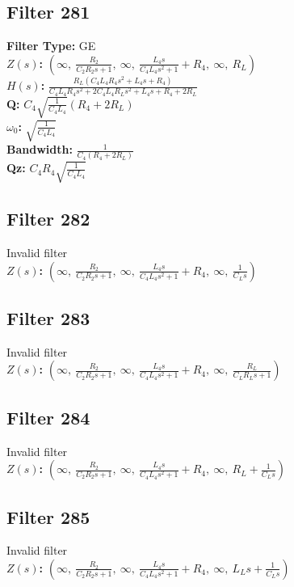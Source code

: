 \documentclass{article}
\begin{document}
\subsection*{Filter 281}
\textbf{Filter Type:} GE \\ 
\textbf{$Z(s)$:} $\left( \infty, \  \frac{R_{2}}{C_{2} R_{2} s + 1}, \  \infty, \  \frac{L_{4} s}{C_{4} L_{4} s^{2} + 1} + R_{4}, \  \infty, \  R_{L}\right)$ \\ 
\textbf{$H(s)$:} $\frac{R_{L} \left(C_{4} L_{4} R_{4} s^{2} + L_{4} s + R_{4}\right)}{C_{4} L_{4} R_{4} s^{2} + 2 C_{4} L_{4} R_{L} s^{2} + L_{4} s + R_{4} + 2 R_{L}}$ \\ 
\textbf{Q:} $C_{4} \sqrt{\frac{1}{C_{4} L_{4}}} \left(R_{4} + 2 R_{L}\right)$ \\ 
\textbf{$\omega_0$:} $\sqrt{\frac{1}{C_{4} L_{4}}}$ \\ 
\textbf{Bandwidth:} $\frac{1}{C_{4} \left(R_{4} + 2 R_{L}\right)}$ \\ 
\textbf{Qz:} $C_{4} R_{4} \sqrt{\frac{1}{C_{4} L_{4}}}$ \\ 
\subsection*{Filter 282}
Invalid filter \\ 
\textbf{$Z(s)$:} $\left( \infty, \  \frac{R_{2}}{C_{2} R_{2} s + 1}, \  \infty, \  \frac{L_{4} s}{C_{4} L_{4} s^{2} + 1} + R_{4}, \  \infty, \  \frac{1}{C_{L} s}\right)$ \\ 
\subsection*{Filter 283}
Invalid filter \\ 
\textbf{$Z(s)$:} $\left( \infty, \  \frac{R_{2}}{C_{2} R_{2} s + 1}, \  \infty, \  \frac{L_{4} s}{C_{4} L_{4} s^{2} + 1} + R_{4}, \  \infty, \  \frac{R_{L}}{C_{L} R_{L} s + 1}\right)$ \\ 
\subsection*{Filter 284}
Invalid filter \\ 
\textbf{$Z(s)$:} $\left( \infty, \  \frac{R_{2}}{C_{2} R_{2} s + 1}, \  \infty, \  \frac{L_{4} s}{C_{4} L_{4} s^{2} + 1} + R_{4}, \  \infty, \  R_{L} + \frac{1}{C_{L} s}\right)$ \\ 
\subsection*{Filter 285}
Invalid filter \\ 
\textbf{$Z(s)$:} $\left( \infty, \  \frac{R_{2}}{C_{2} R_{2} s + 1}, \  \infty, \  \frac{L_{4} s}{C_{4} L_{4} s^{2} + 1} + R_{4}, \  \infty, \  L_{L} s + \frac{1}{C_{L} s}\right)$ \\ 
\end{document}

